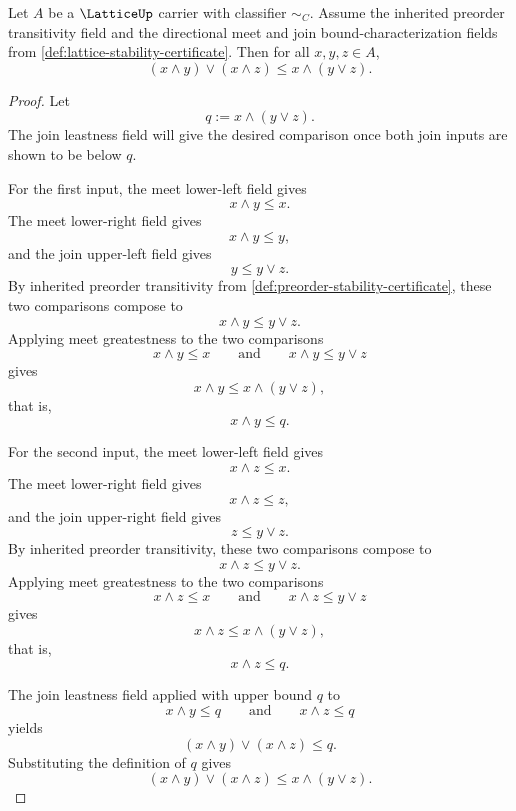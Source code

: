 \begin{theorem}
\label{thm:lattice-one-sided-distributive-inequality-from-directional-bounds}
Let $A$ be a $\LatticeUp$ carrier with classifier $\sim_C$. Assume the inherited preorder transitivity field and the directional meet and join bound-characterization fields from \autoref{def:lattice-stability-certificate}. Then for all $x,y,z\in A$,
$$
  (x\wedge y)\vee(x\wedge z)\le x\wedge(y\vee z).
$$
\end{theorem}
\begin{proof}
Let
$$
  q:=x\wedge(y\vee z).
$$
The join leastness field will give the desired comparison once both join inputs are shown to be below $q$.

For the first input, the meet lower-left field gives
$$
  x\wedge y\le x .
$$
The meet lower-right field gives
$$
  x\wedge y\le y,
$$
and the join upper-left field gives
$$
  y\le y\vee z .
$$
By inherited preorder transitivity from \autoref{def:preorder-stability-certificate}, these two comparisons compose to
$$
  x\wedge y\le y\vee z .
$$
Applying meet greatestness to the two comparisons
$$
  x\wedge y\le x
  \qquad\text{and}\qquad
  x\wedge y\le y\vee z
$$
gives
$$
  x\wedge y\le x\wedge(y\vee z),
$$
that is,
$$
  x\wedge y\le q .
$$

For the second input, the meet lower-left field gives
$$
  x\wedge z\le x .
$$
The meet lower-right field gives
$$
  x\wedge z\le z,
$$
and the join upper-right field gives
$$
  z\le y\vee z .
$$
By inherited preorder transitivity, these two comparisons compose to
$$
  x\wedge z\le y\vee z .
$$
Applying meet greatestness to the two comparisons
$$
  x\wedge z\le x
  \qquad\text{and}\qquad
  x\wedge z\le y\vee z
$$
gives
$$
  x\wedge z\le x\wedge(y\vee z),
$$
that is,
$$
  x\wedge z\le q .
$$

The join leastness field applied with upper bound $q$ to
$$
  x\wedge y\le q
  \qquad\text{and}\qquad
  x\wedge z\le q
$$
yields
$$
  (x\wedge y)\vee(x\wedge z)\le q .
$$
Substituting the definition of $q$ gives
$$
  (x\wedge y)\vee(x\wedge z)\le x\wedge(y\vee z).
$$
\end{proof}
